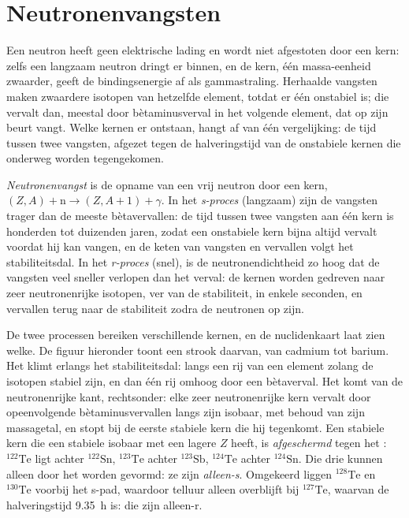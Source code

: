 \section{Neutronenvangsten}\label{sec:b3:origin-of-elements:neutrons}

Een neutron heeft geen elektrische lading en wordt niet afgestoten door een kern: zelfs
een langzaam neutron dringt er binnen, en de kern, één massa-eenheid zwaarder, geeft
de bindingsenergie af als gammastraling. Herhaalde vangsten maken zwaardere
isotopen van hetzelfde element, totdat er één onstabiel is; die vervalt dan,
meestal door bètaminusverval in het volgende element, dat op zijn beurt
vangt. Welke kernen er ontstaan, hangt af van één vergelijking: de tijd tussen
twee vangsten, afgezet tegen de halveringstijd van de onstabiele kernen die
onderweg worden tegengekomen.

\begin{definition}\label{def:b3:origin-of-elements:s-process}
\emph{Neutronenvangst} is de opname van een
vrij neutron door een kern, $(Z, A) + \mathrm{n} \to (Z, A+1) + \gamma$.
In het \emph{s-proces} (langzaam) zijn de vangsten
trager dan de meeste bètavervallen: de tijd tussen twee vangsten aan één
kern is honderden tot duizenden jaren, zodat een onstabiele kern
bijna altijd vervalt voordat hij kan vangen, en de keten van vangsten en vervallen
volgt het stabiliteitsdal. In het
\emph{r-proces} (snel), is de neutronendichtheid
zo hoog dat de vangsten veel sneller verlopen dan het verval: de kernen worden
gedreven naar zeer neutronenrijke isotopen, ver van de stabiliteit, in enkele
seconden, en vervallen terug naar de stabiliteit zodra de neutronen op zijn.
\end{definition}

De twee processen bereiken verschillende kernen, en de nuclidenkaart
laat zien welke. De figuur hieronder toont een strook daarvan, van cadmium tot
barium. Het  klimt erlangs het stabiliteitsdal: langs een
rij van een element zolang de isotopen stabiel zijn, en dan één rij omhoog door een
bètaverval. Het  komt van de neutronenrijke kant, rechtsonder:
elke zeer neutronenrijke kern vervalt door opeenvolgende
bètaminusvervallen langs zijn isobaar, met behoud van zijn massagetal, en stopt
bij de eerste stabiele kern die hij tegenkomt. Een stabiele kern die een stabiele isobaar
met een lagere $Z$ heeft, is \emph{afgeschermd} tegen het : $^{122}\mathrm{Te}$
ligt achter $^{122}\mathrm{Sn}$, $^{123}\mathrm{Te}$ achter
$^{123}\mathrm{Sb}$, $^{124}\mathrm{Te}$ achter $^{124}\mathrm{Sn}$.
Die drie kunnen alleen door het  worden gevormd: ze zijn
\emph{alleen-s}. Omgekeerd liggen $^{128}\mathrm{Te}$ en $^{130}\mathrm{Te}$
voorbij het s-pad, waardoor telluur alleen overblijft bij $^{127}\mathrm{Te}$,
waarvan de halveringstijd \qty{9.35}{h} is: die zijn alleen-r.

